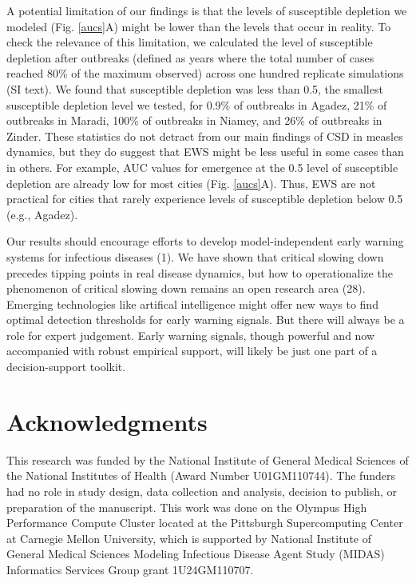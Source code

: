 \documentclass[3p]{elsarticle} %
\begin{document}
A potential limitation of our findings is that the levels of susceptible
depletion we modeled (Fig. \ref{aucs}A) might be lower than the levels
that occur in reality. To check the relevance of this limitation, we
calculated the level of susceptible depletion after outbreaks (defined
as years where the total number of cases reached 80\% of the maximum
observed) across one hundred replicate simulations (SI text). We found
that susceptible depletion was less than 0.5, the smallest susceptible
depletion level we tested, for 0.9\% of outbreaks in Agadez, 21\% of
outbreaks in Maradi, 100\% of outbreaks in Niamey, and 26\% of outbreaks
in Zinder. These statistics do not detract from our main findings of CSD
in measles dynamics, but they do suggest that EWS might be less useful
in some cases than in others. For example, AUC values for emergence at
the 0.5 level of susceptible depletion are already low for most cities
(Fig. \ref{aucs}A). Thus, EWS are not practical for cities that rarely
experience levels of susceptible depletion below 0.5 (e.g., Agadez).

Our results should encourage efforts to develop model-independent early
warning systems for infectious diseases (1). We have shown that critical
slowing down precedes tipping points in real disease dynamics, but how
to operationalize the phenomenon of critical slowing down remains an
open research area (28). Emerging technologies like artifical
intelligence might offer new ways to find optimal detection thresholds
for early warning signals. But there will always be a role for expert
judgement. Early warning signals, though powerful and now accompanied
with robust empirical support, will likely be just one part of a
decision-support toolkit.

\hypertarget{acknowledgments}{%
\section{Acknowledgments}\label{acknowledgments}}

This research was funded by the National Institute of General Medical
Sciences of the National Institutes of Health (Award Number
U01GM110744). The funders had no role in study design, data collection
and analysis, decision to publish, or preparation of the manuscript.
This work was done on the Olympus High Performance Compute Cluster
located at the Pittsburgh Supercomputing Center at Carnegie Mellon
University, which is supported by National Institute of General Medical
Sciences Modeling Infectious Disease Agent Study (MIDAS) Informatics
Services Group grant 1U24GM110707.
\end{document}
